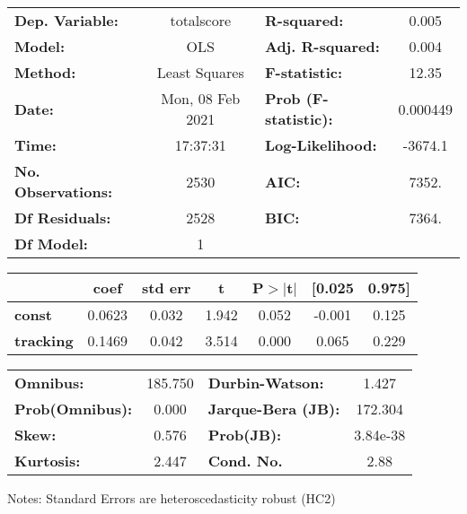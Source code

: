 \begin{center}
\begin{tabular}{lclc}
\toprule
\textbf{Dep. Variable:}    &    totalscore    & \textbf{  R-squared:         } &     0.005   \\
\textbf{Model:}            &       OLS        & \textbf{  Adj. R-squared:    } &     0.004   \\
\textbf{Method:}           &  Least Squares   & \textbf{  F-statistic:       } &     12.35   \\
\textbf{Date:}             & Mon, 08 Feb 2021 & \textbf{  Prob (F-statistic):} &  0.000449   \\
\textbf{Time:}             &     17:37:31     & \textbf{  Log-Likelihood:    } &   -3674.1   \\
\textbf{No. Observations:} &        2530      & \textbf{  AIC:               } &     7352.   \\
\textbf{Df Residuals:}     &        2528      & \textbf{  BIC:               } &     7364.   \\
\textbf{Df Model:}         &           1      & \textbf{                     } &             \\
\bottomrule
\end{tabular}
\begin{tabular}{lcccccc}
                  & \textbf{coef} & \textbf{std err} & \textbf{t} & \textbf{P$> |$t$|$} & \textbf{[0.025} & \textbf{0.975]}  \\
\midrule
\textbf{const}    &       0.0623  &        0.032     &     1.942  &         0.052        &       -0.001    &        0.125     \\
\textbf{tracking} &       0.1469  &        0.042     &     3.514  &         0.000        &        0.065    &        0.229     \\
\bottomrule
\end{tabular}
\begin{tabular}{lclc}
\textbf{Omnibus:}       & 185.750 & \textbf{  Durbin-Watson:     } &    1.427  \\
\textbf{Prob(Omnibus):} &   0.000 & \textbf{  Jarque-Bera (JB):  } &  172.304  \\
\textbf{Skew:}          &   0.576 & \textbf{  Prob(JB):          } & 3.84e-38  \\
\textbf{Kurtosis:}      &   2.447 & \textbf{  Cond. No.          } &     2.88  \\
\bottomrule
\end{tabular}
\end{center}

Notes: \newline
 [1] Standard Errors are heteroscedasticity robust (HC2)
